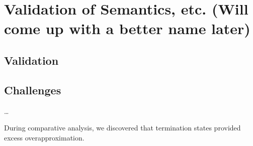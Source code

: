 \chapter{Validation of Semantics, etc. (Will come up with a better name later)}
\label{ch:eicfg-validation}

\section{Validation}

\section{Challenges}

\todo\dots

During comparative analysis, we discovered that termination states provided excess overapproximation.
